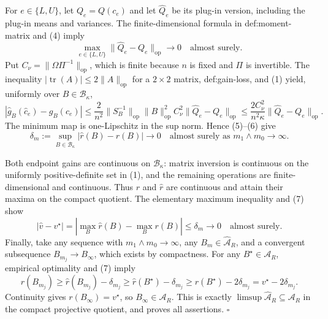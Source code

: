 For \(e\in\{L,U\}\), let \(Q_e=Q(c_e)\) and let \(\widehat Q_e\) be its plug-in version, including the plug-in means and variances.  The finite-dimensional formula in def:moment-matrix and (4) imply
\[
\max_{e\in\{L,U\}}\lVert\widehat Q_e-Q_e\rVert_{\mathrm{op}}\longrightarrow0
\quad\text{almost surely}.
\tag{5}
\]
Put \(C_\nu=\lVert\Omega\Pi^{-1}\rVert_{\mathrm{op}}\), which is finite because \(n\) is fixed and \(\Pi\) is invertible.  The inequality \(|\operatorname{tr}(A)|\le2\lVert A\rVert_{\mathrm{op}}\) for a \(2\times2\) matrix, def:gain-loss, and (1) yield, uniformly over \(B\in\mathcal B_\kappa\),
\[
|\widehat g_B(\widehat c_e)-g_B(c_e)|
\le \frac{2}{n^2}\lVert S_B^{-1}\rVert_{\mathrm{op}}
\lVert B\rVert_{\mathrm{op}}^2 C_\nu^2
\lVert\widehat Q_e-Q_e\rVert_{\mathrm{op}}
\le \frac{2C_\nu^2}{n^2\kappa}
\lVert\widehat Q_e-Q_e\rVert_{\mathrm{op}}.
\tag{6}
\]
The minimum map is one-Lipschitz in the sup norm.  Hence (5)--(6) give
\[
\delta_m:=\sup_{B\in\mathcal B_\kappa}
|\widehat r(B)-r(B)|\longrightarrow0
\quad\text{almost surely as }m_1\wedge m_0\to\infty.
\tag{7}
\]

Both endpoint gains are continuous on \(\mathcal B_\kappa\): matrix inversion is continuous on the uniformly positive-definite set in (1), and the remaining operations are finite-dimensional and continuous.  Thus \(r\) and \(\widehat r\) are continuous and attain their maxima on the compact quotient.  The elementary maximum inequality and (7) show
\[
|\widehat v-v^\star|
=\left|\max_B\widehat r(B)-\max_Br(B)\right|
\le\delta_m\longrightarrow0
\quad\text{almost surely}.
\tag{8}
\]
Finally, take any sequence with \(m_1\wedge m_0\to\infty\), any \(B_m\in\widehat{\mathcal A}_R\), and a convergent subsequence \(B_{m_j}\to B_\infty\), which exists by compactness.  For any \(B^\star\in\mathcal A_R\), empirical optimality and (7) imply
\[
r(B_{m_j})\ge\widehat r(B_{m_j})-\delta_{m_j}
\ge\widehat r(B^\star)-\delta_{m_j}
\ge r(B^\star)-2\delta_{m_j}=v^\star-2\delta_{m_j}.
\]
Continuity gives \(r(B_\infty)=v^\star\), so \(B_\infty\in\mathcal A_R\).  This is exactly \(\limsup\widehat{\mathcal A}_R\subseteq\mathcal A_R\) in the compact projective quotient, and proves all assertions. \(\square\)